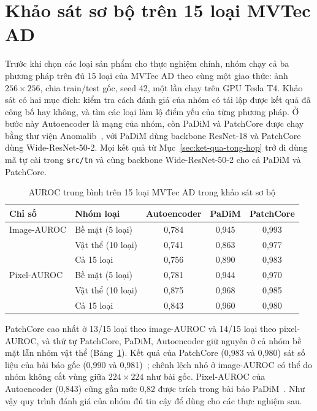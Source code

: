 \section{Khảo sát sơ bộ trên 15 loại MVTec AD}
\label{sec:khao-sat}

Trước khi chọn các loại sản phẩm cho thực nghiệm chính, nhóm chạy cả ba phương pháp trên đủ 15 loại của MVTec AD
theo cùng một giao thức: ảnh $256\times256$, chia train/test gốc, seed 42, một lần chạy trên GPU Tesla T4. Khảo sát có
hai mục đích: kiểm tra cách đánh giá của nhóm có tái lập được kết quả đã công bố hay không, và tìm các loại làm lộ
điểm yếu của từng phương pháp. Ở bước này Autoencoder là mạng của nhóm, còn PaDiM và PatchCore được chạy bằng thư viện
Anomalib~\cite{akcayAnomalibDeepLearning2022}, với PaDiM dùng backbone ResNet-18 và PatchCore dùng Wide-ResNet-50-2.
Mọi kết quả từ Mục~\ref{sec:ket-qua-tong-hop} trở đi dùng mã tự cài trong \texttt{src/tn} và cùng backbone
Wide-ResNet-50-2 cho cả PaDiM và PatchCore.

\begin{table}[htbp]
  \centering
  \caption{AUROC trung bình trên 15 loại MVTec AD trong khảo sát sơ bộ}
  \label{tab:khao-sat}
  \begin{tabular}{@{}llccc@{}}
    \toprule
    Chỉ số & Nhóm loại & Autoencoder & PaDiM & PatchCore \\
    \midrule
    Image-AUROC & Bề mặt (5 loại)  & 0,784 & 0,945 & 0,993 \\
                & Vật thể (10 loại) & 0,741 & 0,863 & 0,977 \\
                & Cả 15 loại       & 0,756 & 0,890 & 0,983 \\
    \midrule
    Pixel-AUROC & Bề mặt (5 loại)  & 0,781 & 0,944 & 0,970 \\
                & Vật thể (10 loại) & 0,875 & 0,968 & 0,985 \\
                & Cả 15 loại       & 0,843 & 0,960 & 0,980 \\
    \bottomrule
  \end{tabular}
\end{table}

PatchCore cao nhất ở 13/15 loại theo image-AUROC và 14/15 loại theo pixel-AUROC, và thứ tự PatchCore, PaDiM,
Autoencoder giữ nguyên ở cả nhóm bề mặt lẫn nhóm vật thể (Bảng~\ref{tab:khao-sat}). Kết quả của PatchCore (0,983 và
0,980) sát số liệu của bài báo gốc (0,990 và 0,981)~\cite{rothTotalRecallIndustrial2022}; chênh lệch nhỏ ở
image-AUROC có thể do nhóm không cắt vùng giữa $224\times224$ như bài gốc. Pixel-AUROC của Autoencoder (0,843) cũng gần
mức 0,82 được trích trong bài báo PaDiM~\cite{defardPaDiMPatchDistribution2021}. Như vậy quy trình đánh giá của nhóm
đủ tin cậy để dùng cho các thực nghiệm sau.

